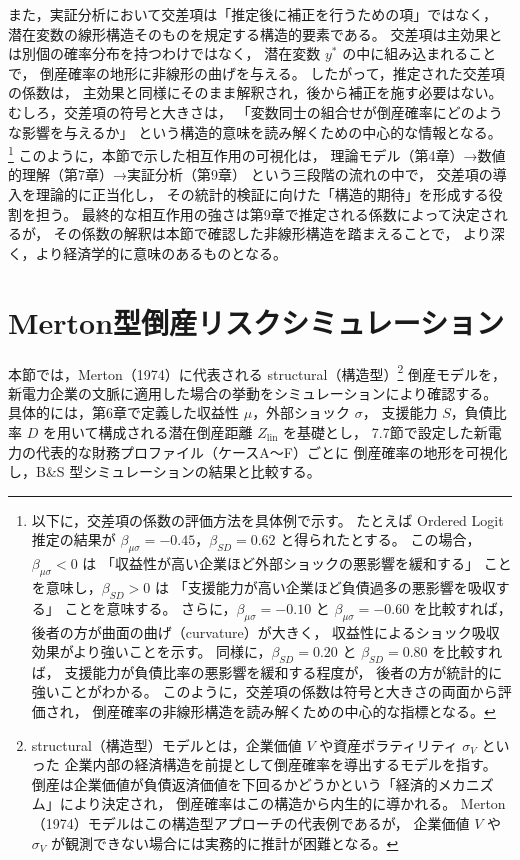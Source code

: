 また，実証分析において交差項は「推定後に補正を行うための項」ではなく，
潜在変数の線形構造そのものを規定する構造的要素である。
交差項は主効果とは別個の確率分布を持つわけではなく，
潜在変数 $y^*$ の中に組み込まれることで，
倒産確率の地形に非線形の曲げを与える。
したがって，推定された交差項の係数は，
主効果と同様にそのまま解釈され，後から補正を施す必要はない。
むしろ，交差項の符号と大きさは，
「変数同士の組合せが倒産確率にどのような影響を与えるか」
という構造的意味を読み解くための中心的な情報となる。
\footnote{
以下に，交差項の係数の評価方法を具体例で示す。
たとえば Ordered Logit 推定の結果が
$\beta_{\mu\sigma}=-0.45$，$\beta_{SD}=0.62$ と得られたとする。
この場合，$\beta_{\mu\sigma}<0$ は
「収益性が高い企業ほど外部ショックの悪影響を緩和する」
ことを意味し，$\beta_{SD}>0$ は
「支援能力が高い企業ほど負債過多の悪影響を吸収する」
ことを意味する。
さらに，$\beta_{\mu\sigma}=-0.10$ と $\beta_{\mu\sigma}=-0.60$ を比較すれば，
後者の方が曲面の曲げ（curvature）が大きく，
収益性によるショック吸収効果がより強いことを示す。
同様に，$\beta_{SD}=0.20$ と $\beta_{SD}=0.80$ を比較すれば，
支援能力が負債比率の悪影響を緩和する程度が，
後者の方が統計的に強いことがわかる。
このように，交差項の係数は符号と大きさの両面から評価され，
倒産確率の非線形構造を読み解くための中心的な指標となる。
}
このように，本節で示した相互作用の可視化は，
理論モデル（第4章）→数値的理解（第7章）→実証分析（第9章）
という三段階の流れの中で，
交差項の導入を理論的に正当化し，
その統計的検証に向けた「構造的期待」を形成する役割を担う。
最終的な相互作用の強さは第9章で推定される係数によって決定されるが，
その係数の解釈は本節で確認した非線形構造を踏まえることで，
より深く，より経済学的に意味のあるものとなる。

% 
\section{Merton型倒産リスクシミュレーション}
\label{sec:merton_risk_simulation}

本節では，Merton（1974）に代表される structural（構造型）\footnote{
structural（構造型）モデルとは，企業価値 $V$ や資産ボラティリティ $\sigma_V$ といった
企業内部の経済構造を前提として倒産確率を導出するモデルを指す。
倒産は企業価値が負債返済価値を下回るかどうかという「経済的メカニズム」により決定され，
倒産確率はこの構造から内生的に導かれる。
Merton（1974）モデルはこの構造型アプローチの代表例であるが，
企業価値 $V$ や $\sigma_V$ が観測できない場合には実務的に推計が困難となる。
}
倒産モデルを，新電力企業の文脈に適用した場合の挙動をシミュレーションにより確認する。
具体的には，第6章で定義した収益性 $\mu$，外部ショック $\sigma$，
支援能力 $S$，負債比率 $D$ を用いて構成される潜在倒産距離 $Z_{\text{lin}}$ を基礎とし，
7.7節で設定した新電力の代表的な財務プロファイル（ケースA〜F）ごとに
倒産確率の地形を可視化し，B\&S 型シミュレーションの結果と比較する。

